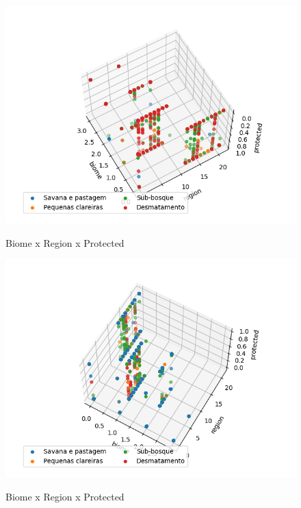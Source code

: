 \begin{multicols}{2}

\begin{figure}[H]
    \caption{Biome x Region x Protected}
     
    \centering 
    \includegraphics[width=1.1\linewidth]{tg1/figuras/biomexregionxprotected--120-30.png}
    \label{figura:one}
\end{figure}
        
\begin{figure}[H]
    \caption{Biome x Region x Protected}
     
    \centering 
    \includegraphics[width=1.1\linewidth]{tg1/figuras/biomexregionxprotected-60--60.png}
    \label{figura:two}
\end{figure}


\end{multicols}
